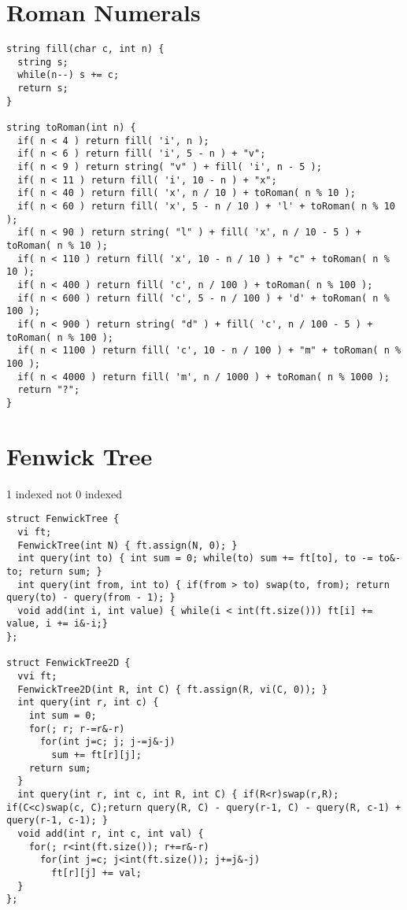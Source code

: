 \documentclass[11pt, oneside]{article}
\begin{document}
\section{Roman Numerals}
\begin{lstlisting}
string fill(char c, int n) {
  string s;
  while(n--) s += c;
  return s;
}

string toRoman(int n) {
  if( n < 4 ) return fill( 'i', n );
  if( n < 6 ) return fill( 'i', 5 - n ) + "v";
  if( n < 9 ) return string( "v" ) + fill( 'i', n - 5 );
  if( n < 11 ) return fill( 'i', 10 - n ) + "x";
  if( n < 40 ) return fill( 'x', n / 10 ) + toRoman( n % 10 );
  if( n < 60 ) return fill( 'x', 5 - n / 10 ) + 'l' + toRoman( n % 10 );
  if( n < 90 ) return string( "l" ) + fill( 'x', n / 10 - 5 ) + toRoman( n % 10 );
  if( n < 110 ) return fill( 'x', 10 - n / 10 ) + "c" + toRoman( n % 10 );
  if( n < 400 ) return fill( 'c', n / 100 ) + toRoman( n % 100 );
  if( n < 600 ) return fill( 'c', 5 - n / 100 ) + 'd' + toRoman( n % 100 );
  if( n < 900 ) return string( "d" ) + fill( 'c', n / 100 - 5 ) + toRoman( n % 100 );
  if( n < 1100 ) return fill( 'c', 10 - n / 100 ) + "m" + toRoman( n % 100 );
  if( n < 4000 ) return fill( 'm', n / 1000 ) + toRoman( n % 1000 );
  return "?";
}

\end{lstlisting}
\section{Fenwick Tree}
1 indexed not 0 indexed
\begin{lstlisting}
struct FenwickTree {
  vi ft;
  FenwickTree(int N) { ft.assign(N, 0); }
  int query(int to) { int sum = 0; while(to) sum += ft[to], to -= to&-to; return sum; }
  int query(int from, int to) { if(from > to) swap(to, from); return query(to) - query(from - 1); }
  void add(int i, int value) { while(i < int(ft.size())) ft[i] += value, i += i&-i;}
};

struct FenwickTree2D {
  vvi ft;
  FenwickTree2D(int R, int C) { ft.assign(R, vi(C, 0)); }
  int query(int r, int c) {
    int sum = 0;
    for(; r; r-=r&-r)
      for(int j=c; j; j-=j&-j)
        sum += ft[r][j];
    return sum;
  }
  int query(int r, int c, int R, int C) { if(R<r)swap(r,R); if(C<c)swap(c, C);return query(R, C) - query(r-1, C) - query(R, c-1) + query(r-1, c-1); }
  void add(int r, int c, int val) {
    for(; r<int(ft.size()); r+=r&-r)
      for(int j=c; j<int(ft.size()); j+=j&-j)
        ft[r][j] += val;
  }
};

\end{lstlisting}
\end{document}
